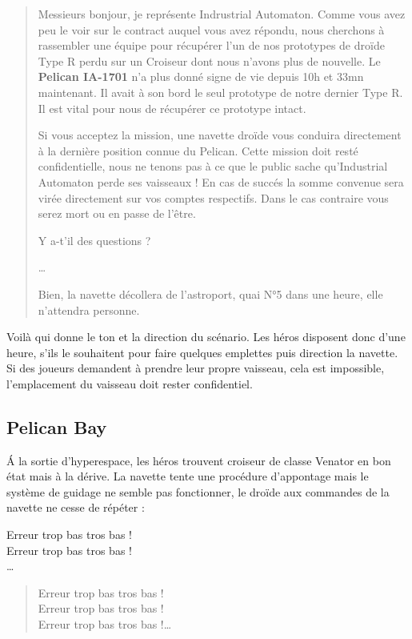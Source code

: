 \begin{quote}
	Messieurs bonjour, je représente Indrustrial Automaton.
	Comme vous avez peu le voir sur le contract auquel vous avez répondu, nous cherchons à rassembler une équipe pour récupérer l’un de nos prototypes de droïde Type R perdu sur un Croiseur dont nous n’avons plus de nouvelle.
	Le \textbf{Pelican IA-1701} n’a plus donné signe de vie depuis 10h et 33mn maintenant. Il avait à son bord le seul prototype de notre dernier Type R. Il est vital pour nous de récupérer ce prototype intact.

	Si vous acceptez la mission, une navette droïde vous conduira directement à la dernière position connue du Pelican. Cette mission doit resté confidentielle, nous ne tenons pas à ce que le public sache qu’Industrial Automaton perde ses vaisseaux !
	En cas de succés la somme convenue sera virée directement sur vos comptes respectifs. Dans le cas contraire vous serez mort ou en passe de l’être.

	Y a-t’il des questions ?

	\ldots

	Bien, la navette décollera de l’astroport, quai N°5 dans une heure, elle n’attendra personne.
\end{quote}

Voilà qui donne le ton et la direction du scénario. Les héros disposent donc d’une heure, s’ils le souhaitent pour faire quelques emplettes puis direction la navette. Si des joueurs demandent à prendre leur propre vaisseau, cela est impossible, l'emplacement du vaisseau doit rester confidentiel.

\subsection{Pelican Bay}
\'A la sortie d’hyperespace, les héros trouvent croiseur de classe Venator en bon état mais à la dérive. La navette tente une procédure d’appontage mais le système de guidage ne semble pas fonctionner, le droïde aux commandes de la navette ne cesse de répéter :
\begin{flushright}
	Erreur trop bas tros bas !\\
	Erreur trop bas tros bas !\\
	\ldots
\end{flushright}

\vspace{3\baselineskip}
\begin{quote}
	Erreur trop bas tros bas !\\
	Erreur trop bas tros bas !\\
	Erreur trop bas tros bas !\ldots
\end{quote}

